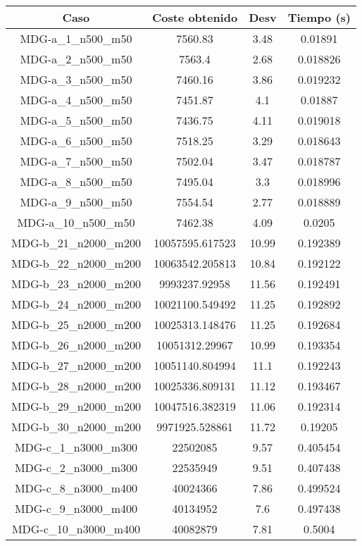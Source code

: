 \documentclass{article}
\begin{document}
\begin{table}[H]
	\centering
	\begin{tabular}{|cccc|}
		\hline
		Caso & Coste obtenido & Desv & Tiempo (s)\\ \hline
		MDG-a\_1\_n500\_m50 & 7560.83 & 3.48 & 0.01891\\
		MDG-a\_2\_n500\_m50 & 7563.4 & 2.68 & 0.018826\\
		MDG-a\_3\_n500\_m50 & 7460.16 & 3.86 & 0.019232\\
		MDG-a\_4\_n500\_m50 & 7451.87 & 4.1 & 0.01887\\
		MDG-a\_5\_n500\_m50 & 7436.75 & 4.11 & 0.019018\\
		MDG-a\_6\_n500\_m50 & 7518.25 & 3.29 & 0.018643\\
		MDG-a\_7\_n500\_m50 & 7502.04 & 3.47 & 0.018787\\
		MDG-a\_8\_n500\_m50 & 7495.04 & 3.3 & 0.018996\\
		MDG-a\_9\_n500\_m50 & 7554.54 & 2.77 & 0.018889\\
		MDG-a\_10\_n500\_m50 & 7462.38 & 4.09 & 0.0205\\
		MDG-b\_21\_n2000\_m200 & 10057595.617523 & 10.99 & 0.192389\\
		MDG-b\_22\_n2000\_m200 & 10063542.205813 & 10.84 & 0.192122\\
		MDG-b\_23\_n2000\_m200 & 9993237.92958 & 11.56 & 0.192491\\
		MDG-b\_24\_n2000\_m200 & 10021100.549492 & 11.25 & 0.192892\\
		MDG-b\_25\_n2000\_m200 & 10025313.148476 & 11.25 & 0.192684\\
		MDG-b\_26\_n2000\_m200 & 10051312.29967 & 10.99 & 0.193354\\
		MDG-b\_27\_n2000\_m200 & 10051140.804994 & 11.1 & 0.192243\\
		MDG-b\_28\_n2000\_m200 & 10025336.809131 & 11.12 & 0.193467\\
		MDG-b\_29\_n2000\_m200 & 10047516.382319 & 11.06 & 0.192314\\
		MDG-b\_30\_n2000\_m200 & 9971925.528861 & 11.72 & 0.19205\\
		MDG-c\_1\_n3000\_m300 & 22502085 & 9.57 & 0.405454\\
		MDG-c\_2\_n3000\_m300 & 22535949 & 9.51 & 0.407438\\
		MDG-c\_8\_n3000\_m400 & 40024366 & 7.86 & 0.499524\\
		MDG-c\_9\_n3000\_m400 & 40134952 & 7.6 & 0.497438\\
		MDG-c\_10\_n3000\_m400 & 40082879 & 7.81 & 0.5004\\

\end{tabular}
\end{table}
\end{document}
